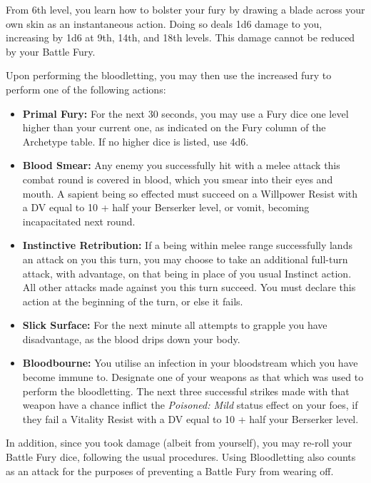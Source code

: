 {
	From 6th level, you learn how to bolster your fury by drawing a blade across your own skin as an instantaneous action. Doing so deals 1d6 damage to you, increasing by 1d6 at 9th, 14th, and 18th levels. This damage cannot be reduced by your Battle Fury. 
	
	Upon performing the bloodletting, you may then use the increased fury to perform one of the following actions:
	
	\newcommand\blood[2]{\item {\bf #1:} #2 }
	
	\begin{itemize}
		\blood{Primal Fury}{For the next 30 seconds, you may use a Fury dice one level higher than your current one, as indicated on the Fury column of the Archetype table. If no higher dice is listed, use 4d6.}
		\blood{Blood Smear}{Any enemy you successfully hit with a melee attack this combat round is covered in blood, which you smear into their eyes and mouth. A sapient being so effected must succeed on a Willpower Resist with a DV equal to 10 + half your Berserker level, or vomit, becoming incapacitated next round.}
		\blood{Instinctive Retribution}{If a being within melee range successfully lands an attack on you this turn, you may choose to take an additional full-turn attack, with advantage, on that being in place of you usual Instinct action. All other attacks made against you this turn succeed. You must declare this action at the beginning of the turn, or else it fails.}
		\blood{Slick Surface}{For the next minute all attempts to grapple you have disadvantage, as the blood drips down your body.}
		\blood{Bloodbourne}{You utilise an infection in your bloodstream which you have become immune to. Designate one of your weapons as that which was used to perform the bloodletting. The next three successful strikes made with that weapon have a chance inflict the {\it Poisoned: Mild} status effect on your foes, if they fail a Vitality Resist with a DV equal to 10 + half your Berserker level.}
	\end{itemize}
	
	In addition, since you took damage (albeit from yourself), you may re-roll your Battle Fury dice, following the usual procedures. Using Bloodletting also counts as an attack for the purposes of preventing a Battle Fury from wearing off.  
	
}


